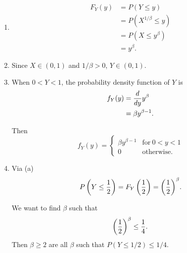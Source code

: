 \documentclass{tufte-handout}
\begin{document}
\bigskip

\begin{enumerate}[label=(\alph*)]
\item
  \begin{align*}
    F_Y(y)
    &= P(Y \leq y)\\
    &= P(X^{1/\beta} \leq y)\\
    &= P(X \leq y^\beta)\\
    &= y^\beta.
  \end{align*}
\item Since $X \in (0,1)$ and $1/\beta > 0$, $Y \in (0,1)$.
\item When $0 < Y < 1$, the probability density function of $Y$ is
  \begin{align*}
    f_Y(y)
    &= {d \over dy} y^\beta\\
    &= \beta y^{\beta - 1}.
  \end{align*}

  Then
  \[
  f_Y(y) =
  \begin{cases}
    \beta y^{\beta - 1} & \mathrm{for}\ 0 < y < 1\\
    0 & \mathrm{otherwise.}
  \end{cases}
  \]
\item Via (a)
  \[
  P\left( Y \leq {1 \over 2} \right) = F_Y\left({1 \over 2} \right) =
  {\left( {1 \over 2} \right)}^\beta.
  \]

  We want to find $\beta$ such that
  \[
  {\left( {1 \over 2} \right)}^\beta \leq {1 \over 4}.
  \]
  Then $\beta \geq 2$ are all $\beta$ such that $P(Y \leq 1/2) \leq 1/4$.
\end{enumerate}
\end{document}
